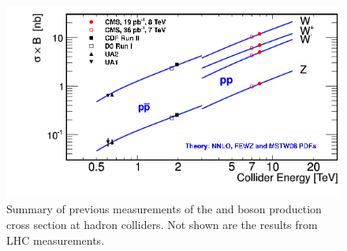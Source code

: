 \begin{figure}
\centering
\includegraphics[width=0.6\linewidth]{plots/Intro/summary.png}
\caption{Summary of previous measurements of the \W and \Z boson production cross section at hadron colliders. Not shown are the results from \serah LHC measurements.}
\label{fig:intro:summary:meas}
\end{figure}